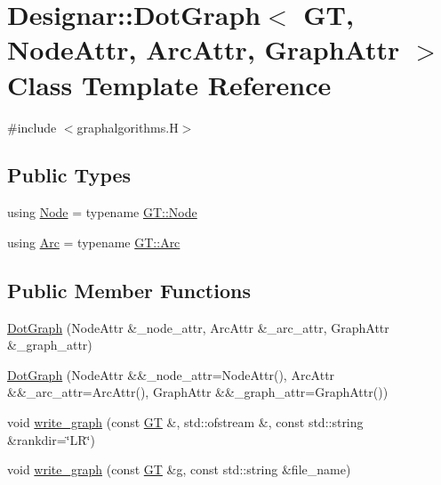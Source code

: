\hypertarget{class_designar_1_1_dot_graph}{}\section{Designar\+:\+:Dot\+Graph$<$ GT, Node\+Attr, Arc\+Attr, Graph\+Attr $>$ Class Template Reference}
\label{class_designar_1_1_dot_graph}


{\ttfamily \#include $<$graphalgorithms.\+H$>$}

\subsection*{Public Types}
\begin{DoxyCompactItemize}
\item 
using \hyperlink{class_designar_1_1_dot_graph_a591d14a84a622be5bdcc190543c8ca46}{Node} = typename \hyperlink{class_designar_1_1_graph_a5dfc7dba9d092ac489c72e40390c37d0}{G\+T\+::\+Node}
\item 
using \hyperlink{class_designar_1_1_dot_graph_a72979d4373928269dc67fb369548701d}{Arc} = typename \hyperlink{class_designar_1_1_graph_a74c730ef4ce2d20f998d72bd25c2b5bf}{G\+T\+::\+Arc}
\end{DoxyCompactItemize}
\subsection*{Public Member Functions}
\begin{DoxyCompactItemize}
\item 
\hyperlink{class_designar_1_1_dot_graph_a6173edee577a1311c20f6d6bba5e2673}{Dot\+Graph} (Node\+Attr \&\+\_\+node\+\_\+attr, Arc\+Attr \&\+\_\+arc\+\_\+attr, Graph\+Attr \&\+\_\+graph\+\_\+attr)
\item 
\hyperlink{class_designar_1_1_dot_graph_a73a8e33201f40c6a3085eda7a573af6f}{Dot\+Graph} (Node\+Attr \&\&\+\_\+node\+\_\+attr=Node\+Attr(), Arc\+Attr \&\&\+\_\+arc\+\_\+attr=Arc\+Attr(), Graph\+Attr \&\&\+\_\+graph\+\_\+attr=Graph\+Attr())
\item 
void \hyperlink{class_designar_1_1_dot_graph_afa9f692e6ec45dba1cd8e9ebf830f212}{write\+\_\+graph} (const \hyperlink{demo-buildgraph_8_c_a3001c40d2c31ca87ed96cd7d1334a55e}{GT} \&, std\+::ofstream \&, const std\+::string \&rankdir=\char`\"{}LR\char`\"{})
\item 
void \hyperlink{class_designar_1_1_dot_graph_a6f2b98b76d2c970ad875a59388f693cb}{write\+\_\+graph} (const \hyperlink{demo-buildgraph_8_c_a3001c40d2c31ca87ed96cd7d1334a55e}{GT} \&g, const std\+::string \&file\+\_\+name)
\end{DoxyCompactItemize}


